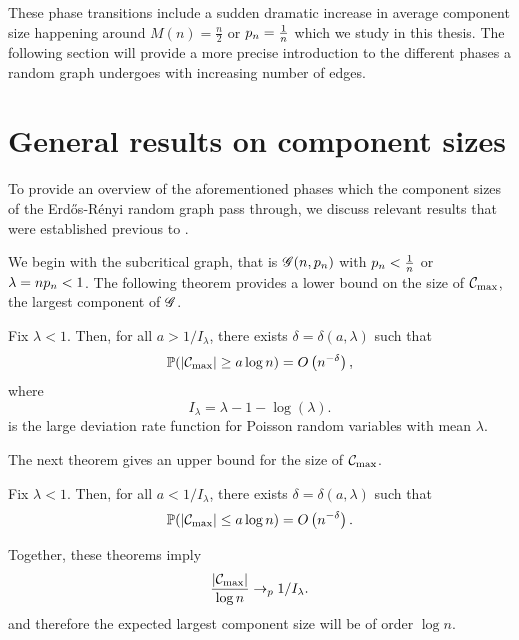 These phase transitions include a sudden dramatic increase in average component size happening around $M(n) = \frac{n}{2}$ or $p_n = \frac{1}{n}$
which we study in this thesis.
The following section will provide a more precise introduction to the different phases a random graph undergoes
with increasing number of edges.


\section{General results on component sizes}

To provide an overview of the aforementioned phases
which the component sizes of the Erd\H{o}s-Rényi random graph pass through,
we discuss relevant results that were established previous to \cite{Aldous.1997}.

We begin with the subcritical graph, that is
$\mathscr{G}(n, p_n)$ with $p_n < \frac{1}{n}$
or $\lambda = n p_n < 1$.
The following theorem provides a lower bound on the size of $\mathcal{C}_{\max}$, the largest component of $\mathscr{G}$.
\begin{theorem}
	Fix $\lambda < 1$. 
	Then, for all $a > 1/I_{\lambda}$, 
	there exists $\delta = \delta(a, \lambda)$ such that
	\begin{equation}
		\mathbb{P}( |\mathcal{C}_{\max}| \geq a \log n ) = O\left(n^{-\delta}\right),
	\end{equation}
	where 
	\begin{equation}
		I_{\lambda} = \lambda - 1 - \log(\lambda).
	\end{equation}
	is the large deviation rate function for Poisson random variables with mean $\lambda$.
\end{theorem}
The next theorem gives an upper bound for the size of $\mathcal{C}_{\max}$.
\begin{theorem}
	Fix $\lambda < 1$. 
	Then, for all $a < 1/I_{\lambda}$, 
	there exists $\delta = \delta(a, \lambda)$ such that
	\begin{equation}
	\mathbb{P}( |\mathcal{C}_{\max}| \leq a \log n ) = O\left(n^{-\delta}\right).
	\end{equation}
\end{theorem}
Together, these theorems imply
\begin{equation}
	\frac{|\mathcal{C}_{\max}|}{\log n} \rightarrow_p 1/I_{\lambda}.
\end{equation}
and therefore the expected largest component size will be of order $\log n$.

